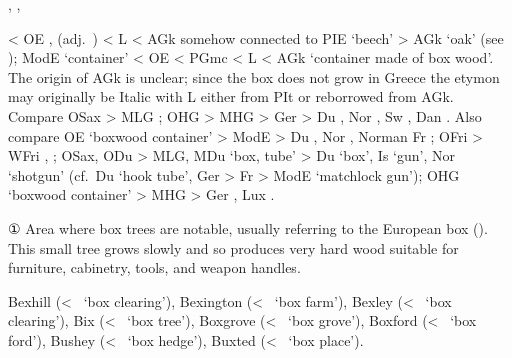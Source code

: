 \documentclass[12pt,letterpaper,oneside,article,draft]{memoir}
\begin{document}
\begin{Lemma}
\begin{Also}
	, , 
\end{Also}
\begin{Etymology}
	< OE ,  (adj.\ ) < L  < AGk  
		somehow connected to PIE  ‘beech’ > AGk   ‘oak’
			(see );
		ModE  ‘container’ < OE  < PGmc  < L 
			< AGk   ‘container made of box wood’.
	The origin of AGk   is unclear; since the box does not grow in Greece
		the etymon may originally be Italic with L  either from PIt or reborrowed from AGk.
	Compare
	OSax  > MLG ;
	OHG  > MHG  > Ger  > Du ,
		Nor , Sw , Dan .
	Also compare
	OE  ‘boxwood container’ > ModE  > Du , Nor , Norman Fr ;
	OFri  > WFri , ;
	OSax, ODu  > MLG, MDu  ‘box, tube’ > Du  ‘box’,
		Is  ‘gun’, Nor  ‘shotgun’
		(cf.\ Du  ‘hook tube’, Ger  >
			Fr  > ModE  ‘matchlock gun’);
	OHG  ‘boxwood container’ > MHG  > Ger , Lux .
\end{Etymology}
\begin{Definitions}
	① Area where box trees are notable, usually referring to the European box (). This small tree grows slowly and so produces very hard wood suitable for furniture, cabinetry, tools, and weapon handles.
\end{Definitions}
\begin{Examples}
	Bexhill (<~ ‘box clearing’),
	Bexington (<~ ‘box farm’),
	Bexley (<~ ‘box clearing’),
	Bix (<~ ‘box tree’),
	Boxgrove (<~ ‘box grove’),
	Boxford (<~ ‘box ford’),
	Bushey (<~ ‘box hedge’),
	Buxted (<~ ‘box place’).
\end{Examples}
\end{Lemma}
\end{document}
